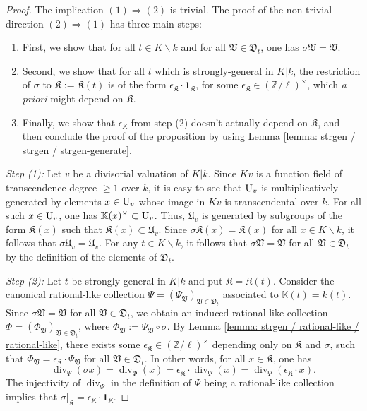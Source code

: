 \documentclass[11pt]{amsart}
\theoremstyle{definition}
\theoremstyle{remark}
\numberwithin{equation}{section}
\DeclareMathOperator{\divv}{div}
\newcommand{\Z}{\mathbb{Z}}
\newcommand{\U}{{\rm U}}
\newcommand{\Kbb}{\mathbb{K}}
\newcommand{\Kfrak}{\mathfrak{K}}
\newcommand{\Ufrak}{\mathfrak{U}}
\newcommand{\Dfrak}{\mathfrak{D}}
\newcommand{\Vfrak}{\mathfrak{V}}
\newcommand{\one}{\mathbf{1}}
\begin{document}
\begin{proof}
  The implication $(1) \Rightarrow (2)$ is trivial.
  The proof of the non-trivial direction $(2) \Rightarrow (1)$ has three main steps:
  \begin{enumerate}
    \item First, we show that for all $t \in K \smallsetminus k$ and for all $\Vfrak \in \Dfrak_t$, one has $\sigma \Vfrak = \Vfrak$.
    \item Second, we show that for all $t$ which is strongly-general in $K|k$, the restriction of $\sigma$ to $\Kfrak := \Kfrak(t)$ is of the form $\epsilon_\Kfrak \cdot \one_\Kfrak$, for some $\epsilon_\Kfrak \in (\Z/\ell)^\times$, which \emph{a priori} might depend on $\Kfrak$.
    \item Finally, we show that $\epsilon_\Kfrak$ from step (2) doesn't actually depend on $\Kfrak$, and then conclude the proof of the proposition by using Lemma \ref{lemma: strgen / strgen / strgen-generate}.
  \end{enumerate}

  \vskip 5pt
  \noindent\emph{Step (1):} Let $v$ be a divisorial valuation of $K|k$.
  Since $Kv$ is a function field of transcendence degree $\geq 1$ over $k$, it is easy to see that $\U_v$ is multiplicatively generated by elements $x \in \U_v$ whose image in $Kv$ is transcendental over $k$.
  For all such $x \in \U_v$, one has $\Kbb(x)^\times \subset \U_v$.
  Thus, $\Ufrak_v$ is generated by subgroups of the form $\Kfrak(x)$ such that $\Kfrak(x) \subset \Ufrak_v$.
  Since $\sigma \Kfrak(x) = \Kfrak(x)$ for all $x \in K \smallsetminus k$, it follows that $\sigma \Ufrak_v = \Ufrak_v$.
  For any $t \in K \smallsetminus k$, it follows that $\sigma \Vfrak = \Vfrak$ for all $\Vfrak \in \Dfrak_t$ by the definition of the elements of $\Dfrak_t$.

  \vskip 5pt
  \noindent\emph{Step (2):}
  Let $t$ be strongly-general in $K|k$ and put $\Kfrak = \Kfrak(t)$.
  Consider the canonical rational-like collection $\Psi = (\Psi_\Vfrak)_{\Vfrak \in \Dfrak_t}$ associated to $\Kbb(t) = k(t)$.
  Since $\sigma \Vfrak = \Vfrak$ for all $\Vfrak \in \Dfrak_t$, we obtain an induced rational-like collection $\Phi = (\Phi_\Vfrak)_{\Vfrak \in \Dfrak_t}$, where $\Phi_\Vfrak := \Psi_\Vfrak \circ \sigma$.
  By Lemma \ref{lemma: strgen / rational-like / rational-like}, there exists some $\epsilon_\Kfrak \in (\Z/\ell)^\times$ depending only on $\Kfrak$ and $\sigma$, such that $\Phi_\Vfrak = \epsilon_\Kfrak \cdot \Psi_\Vfrak$ for all $\Vfrak \in \Dfrak_t$.
  In other words, for all $x \in \Kfrak$, one has
  \[ \divv_\Psi(\sigma x) = \divv_\Phi(x) = \epsilon_\Kfrak \cdot \divv_\Psi(x) = \divv_\Psi(\epsilon_\Kfrak \cdot x). \]
  The injectivity of $\divv_\Psi$ in the definition of $\Psi$ being a rational-like collection implies that $\sigma|_\Kfrak = \epsilon_\Kfrak \cdot \one_\Kfrak$.


\end{proof}
\end{document}
